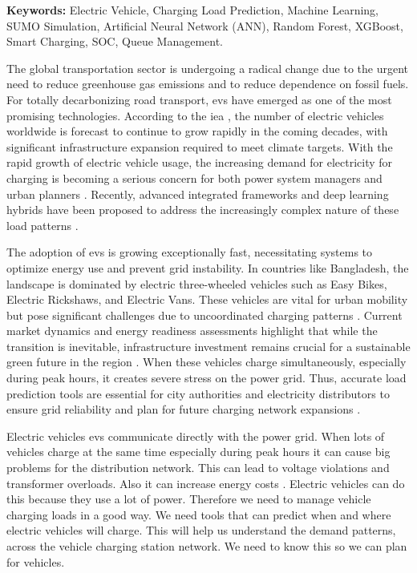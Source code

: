 \documentclass{thesis-library}
\begin{document}
\vspace{0.5cm}
\noindent\textbf{Keywords:} Electric Vehicle, Charging Load Prediction, Machine Learning,
SUMO Simulation, Artificial Neural Network (ANN), Random Forest, XGBoost, Smart Charging, SOC, Queue Management.

\newpage
{}
\enablemainfooter
\newpage

The global transportation sector is undergoing a radical change due to the urgent need to reduce greenhouse gas emissions and to reduce dependence on fossil fuels. For totally decarbonizing road transport, \Gls{ev}s have emerged as one of the most promising technologies. According to the \Gls{iea} \cite{ev_growth2025}, the number of electric vehicles worldwide is forecast to continue to grow rapidly in the coming decades, with significant infrastructure expansion required to meet climate targets. With the rapid growth of electric vehicle usage, the increasing demand for electricity for charging is becoming a serious concern for both power system managers and urban planners \cite{smart_charging2022}. Recently, advanced integrated frameworks and deep learning hybrids have been proposed to address the increasingly complex nature of these load patterns \cite{siddiqui2025electric, ran2025ev}.

The adoption of \Gls{ev}s is growing exceptionally fast, necessitating systems to optimize energy use and prevent grid instability. In countries like Bangladesh, the landscape is dominated by electric three-wheeled vehicles such as Easy Bikes, Electric Rickshaws, and Electric Vans. These vehicles are vital for urban mobility but pose significant challenges due to uncoordinated charging patterns \cite{doley2024sustainability}. Current market dynamics and energy readiness assessments highlight that while the transition is inevitable, infrastructure investment remains crucial for a sustainable green future in the region \cite{lightcastle_ev_2025}. When these vehicles charge simultaneously, especially during peak hours, it creates severe stress on the power grid. Thus, accurate load prediction tools are essential for city authorities and electricity distributors to ensure grid reliability and plan for future charging network expansions \cite{regression_ev2020}.

Electric vehicles \Gls{ev}s communicate directly with the power grid. When lots of vehicles charge at the same time especially during peak hours it can cause big problems for the distribution network. This can lead to voltage violations and transformer overloads. Also it can increase energy costs \cite{peak_load_shaving2021}. Electric vehicles can do this because they use a lot of power. Therefore we need to manage vehicle charging loads in a good way. We need tools that can predict when and where electric vehicles will charge. This will help us understand the demand patterns, across the vehicle charging station network. We need to know this so we can plan for vehicles.
\end{document}
